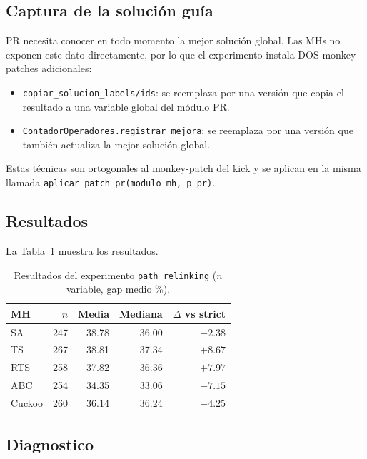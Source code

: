 \subsection{Captura de la solución guía}

PR necesita conocer en todo momento la mejor solución global. Las MHs
no exponen este dato directamente, por lo que el experimento instala
DOS monkey-patches adicionales:

\begin{itemize}
\item \texttt{copiar\_solucion\_labels/ids}: se reemplaza por una
  versión que copia el resultado a una variable global del módulo PR.
\item \texttt{ContadorOperadores.registrar\_mejora}: se reemplaza por
  una versión que también actualiza la mejor solución global.
\end{itemize}

Estas técnicas son ortogonales al monkey-patch del kick y se aplican en
la misma llamada \texttt{aplicar\_patch\_pr(modulo\_mh, p\_pr)}.

\subsection{Resultados}

La Tabla~\ref{tab:pr-resultados} muestra los resultados.

\begin{table}[h]
\centering
\caption{Resultados del experimento \texttt{path\_relinking}
($n$ variable, gap medio \%).}
\label{tab:pr-resultados}
\small
\begin{tabular}{lrrrr}
\toprule
MH & $n$ & Media & Mediana & $\Delta$ vs strict \\
\midrule
SA      & 247 & 38.78 & 36.00 & $-2.38$ \\
TS      & 267 & 38.81 & 37.34 & $+8.67$ \\
RTS     & 258 & 37.82 & 36.36 & $+7.97$ \\
ABC     & 254 & 34.35 & 33.06 & $-7.15$ \\
Cuckoo  & 260 & 36.14 & 36.24 & $-4.25$ \\
\bottomrule
\end{tabular}
\end{table}

\subsection{Diagnostico}

